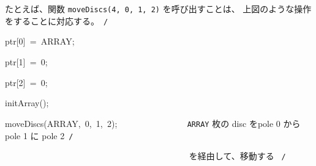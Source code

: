 \documentclass[a4paper,10pt]{article}
\def\mc{\relax}
\begin{document}
たとえば、関数 {\tt moveDiscs(4, 0, 1, 2)} を呼び出すことは、
上図のような操作をすることに対応する。\hfill \rm\mc \ {\tt *}{\tt /}
\tt\mc 

\noindent
\mbox{}\hfill

\noindent
\mbox{}ptr[0]{\tt\mc \ }={\tt\mc \ }ARRAY;

\noindent
\mbox{}ptr[1]{\tt\mc \ }={\tt\mc \ }0;

\noindent
\mbox{}ptr[2]{\tt\mc \ }={\tt\mc \ }0;

\noindent
\mbox{}\hfill

\noindent
\mbox{}initArray();

\noindent
\mbox{}moveDiscs(ARRAY,{\tt\mc \ }0,{\tt\mc \ }1,{\tt\mc \ }2);{\tt\mc \ }{\tt\mc \ }{\tt\mc \ }{\tt\mc \ }{\tt\mc \ }{\tt\mc \ }{\tt\mc \ }{\tt\mc \ }{\tt\mc \ }{\tt\mc \ }{\tt\mc \ }{\tt\mc \ }{\tt\mc \ }{\tt\mc \ }\rm\mc {\tt /}{\tt *}\  \ {\tt ARRAY} 枚の disc をpole 0 から pole 1 に pole 2\hfill \rm\mc \ {\tt *}{\tt /}
\tt\mc 

\noindent
\mbox{}{\tt\mc \ }{\tt\mc \ }{\tt\mc \ }{\tt\mc \ }{\tt\mc \ }{\tt\mc \ }{\tt\mc \ }{\tt\mc \ }{\tt\mc \ }{\tt\mc \ }{\tt\mc \ }{\tt\mc \ }{\tt\mc \ }{\tt\mc \ }{\tt\mc \ }{\tt\mc \ }{\tt\mc \ }{\tt\mc \ }{\tt\mc \ }{\tt\mc \ }{\tt\mc \ }{\tt\mc \ }{\tt\mc \ }{\tt\mc \ }{\tt\mc \ }{\tt\mc \ }{\tt\mc \ }{\tt\mc \ }{\tt\mc \ }{\tt\mc \ }{\tt\mc \ }{\tt\mc \ }{\tt\mc \ }{\tt\mc \ }{\tt\mc \ }{\tt\mc \ }{\tt\mc \ }{\tt\mc \ }{\tt\mc \ }{\tt\mc \ }\rm\mc {\tt /}{\tt *}\  \ を経由して、移動する \hfill \rm\mc \ {\tt *}{\tt /}

\tt\mc 

\rm\mc
\end{document}
